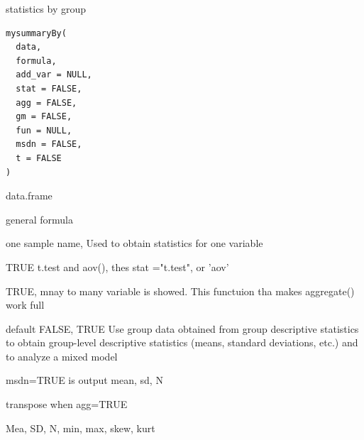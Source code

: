 \documentclass[a4paper]{book}
\begin{document}
%
\begin{Description}
statistics by group
\end{Description}
%
\begin{Usage}
\begin{verbatim}
mysummaryBy(
  data,
  formula,
  add_var = NULL,
  stat = FALSE,
  agg = FALSE,
  gm = FALSE,
  fun = NULL,
  msdn = FALSE,
  t = FALSE
)
\end{verbatim}
\end{Usage}
%
\begin{Arguments}
\begin{ldescription}
\item[\code{data}] data.frame

\item[\code{formula}] general formula

\item[\code{add\_var}] one sample name, Used to obtain statistics for one variable

\item[\code{stat}] TRUE t.test and aov(), thes stat ="t.test", or 'aov'

\item[\code{agg}] TRUE, mnay to many variable is showed. This functuion tha makes aggregate() work full

\item[\code{gm}] default FALSE, TRUE Use group data obtained from group descriptive statistics to obtain group-level descriptive statistics (means, standard deviations, etc.) and to analyze a mixed model

\item[\code{msdn}] msdn=TRUE is output mean, sd, N

\item[\code{t}] transpose  when agg=TRUE
\end{ldescription}
\end{Arguments}
%
\begin{Value}
Mea, SD, N, min, max, skew, kurt
\end{Value}
%
\end{document}
